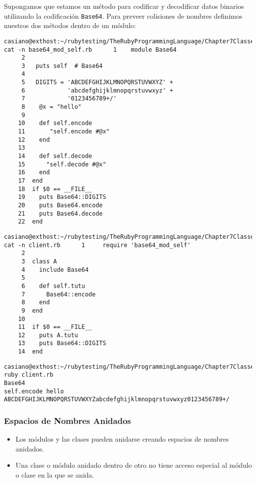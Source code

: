 Supongamos que estamos un método para codificar y decodificar datos
binarios utilizando la codificación \verb|Base64|.
Para preveer colisiones de nombres definimos nuestros dos métodos
dentro de un módulo:

\begin{verbatim}
casiano@exthost:~/rubytesting/TheRubyProgrammingLanguage/Chapter7ClassesAndModules/modules$ cat -n base64_mod_self.rb      1    module Base64
     2    
     3   puts self  # Base64
     4  
     5   DIGITS = 'ABCDEFGHIJKLMNOPQRSTUVWXYZ' +
     6            'abcdefghijklmnopqrstuvwxyz' +
     7            '0123456789+/'
     8    @x = "hello"
     9            
    10    def self.encode
    11       "self.encode #@x"
    12    end 
    13  
    14    def self.decode
    15      "self.decode #@x"
    16    end 
    17  end
    18  if $0 == __FILE__
    19    puts Base64::DIGITS
    20    puts Base64.encode
    21    puts Base64.decode
    22  end
\end{verbatim}

\begin{verbatim}
casiano@exthost:~/rubytesting/TheRubyProgrammingLanguage/Chapter7ClassesAndModules/modules$ cat -n client.rb      1     require 'base64_mod_self'
     2  
     3  class A
     4    include Base64
     5  
     6    def self.tutu
     7      Base64::encode
     8    end
     9  end
    10  
    11  if $0 == __FILE__
    12    puts A.tutu
    13    puts Base64::DIGITS
    14  end
\end{verbatim}

\begin{verbatim}
casiano@exthost:~/rubytesting/TheRubyProgrammingLanguage/Chapter7ClassesAndModules/modules$ ruby client.rb 
Base64
self.encode hello
ABCDEFGHIJKLMNOPQRSTUVWXYZabcdefghijklmnopqrstuvwxyz0123456789+/
\end{verbatim}

      \subsubsection{Espacios de Nombres Anidados}
\begin{itemize}
\item
Los módulos y las clases pueden anidarse creando espacios de nombres anidados.

\item
Una clase o módulo anidado dentro de otro no tiene acceso especial al módulo o clase en la que se anida.
\end{itemize}

